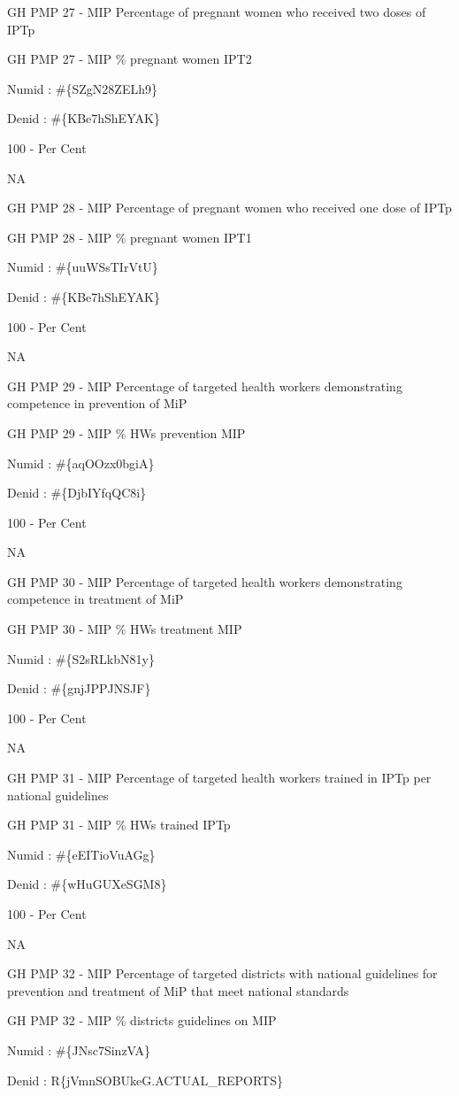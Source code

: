 \documentclass[]{book}
\begin{document}
GH PMP 27 - MIP Percentage of pregnant women who received two doses of IPTp

GH PMP 27 - MIP \% pregnant women IPT2

Numid : \#\{SZgN28ZELh9\}

Denid : \#\{KBe7hShEYAK\}

100 - Per Cent

NA

GH PMP 28 - MIP Percentage of pregnant women who received one dose of IPTp

GH PMP 28 - MIP \% pregnant women IPT1

Numid : \#\{uuWSsTIrVtU\}

Denid : \#\{KBe7hShEYAK\}

100 - Per Cent

NA

GH PMP 29 - MIP Percentage of targeted health workers demonstrating competence in prevention of MiP

GH PMP 29 - MIP \% HWs prevention MIP

Numid : \#\{aqOOzx0bgiA\}

Denid : \#\{DjbIYfqQC8i\}

100 - Per Cent

NA

GH PMP 30 - MIP Percentage of targeted health workers demonstrating competence in treatment of MiP

GH PMP 30 - MIP \% HWs treatment MIP

Numid : \#\{S2sRLkbN81y\}

Denid : \#\{gnjJPPJNSJF\}

100 - Per Cent

NA

GH PMP 31 - MIP Percentage of targeted health workers trained in IPTp per national guidelines

GH PMP 31 - MIP \% HWs trained IPTp

Numid : \#\{eEITioVuAGg\}

Denid : \#\{wHuGUXeSGM8\}

100 - Per Cent

NA

GH PMP 32 - MIP Percentage of targeted districts with national guidelines for prevention and treatment of MiP that meet national standards

GH PMP 32 - MIP \% districts guidelines on MIP

Numid : \#\{JNsc7SinzVA\}

Denid : R\{jVmnSOBUkeG.ACTUAL\_REPORTS\}
\end{document}
